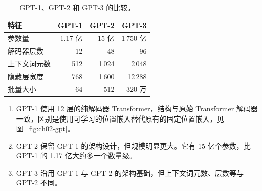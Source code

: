 \begin{table}[!htbp]
\centering
\caption{GPT-1、GPT-2 和 GPT-3 的比较。}
\label{tab:ch02-gpt}
\small
\begin{tabularx}{\linewidth}{@{}Xrrr@{}}
\toprule
特征 & GPT-1 & GPT-2 & GPT-3\\
\midrule
参数量 & 1.17 亿 & 15 亿 & 1\,750 亿\\
解码器层数 & 12 & 48 & 96\\
上下文词元数 & 512 & 1\,024 & 2\,048\\
隐藏层宽度 & 768 & 1\,600 & 12\,288\\
批量大小 & 64 & 512 & 320 万\\
\bottomrule
\end{tabularx}
\end{table}

\begin{enumerate}
\item GPT-1 使用 12 层的纯解码器 Transformer，结构与原始 Transformer 解码器一致，区别是使用可学习的位置嵌入替代原有的固定位置嵌入，见图~\ref{fig:ch02-gpt}。
\item GPT-2 保留 GPT-1 的架构设计，但规模明显更大。它有 15 亿个参数，比 GPT-1 的 1.17 亿大约多一个数量级。
\item GPT-3 沿用 GPT-1 与 GPT-2 的架构基础，但上下文词元数、层数等与 GPT-2 不同。
\end{enumerate}

